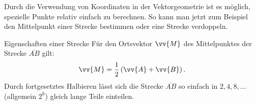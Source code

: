 Durch die Verwendung von Koordinaten in der Vektorgeometrie ist es möglich, spezielle Punkte relativ einfach zu berechnen. So kann man jetzt zum Beispiel den Mittelpunkt einer Strecke bestimmen oder eine Strecke verdoppeln.
\begin{b8d*}{Eigenschaften einer Strecke}{}
Für den Ortsvektor $\vv{M}$ des Mittelpunktes der Strecke $\overline{AB}$ gilt: $$\vv{M} = \dfrac{1}{2}\left(\vv{A} + \vv{B}\right).$$
Durch fortgesetztes Halbieren lässt sich die Strecke $\overline{AB}$ so einfach in $2, 4, 8, \ldots$ (allgemein $2^k$) gleich lange Teile einteilen. 
\end{b8d*}
